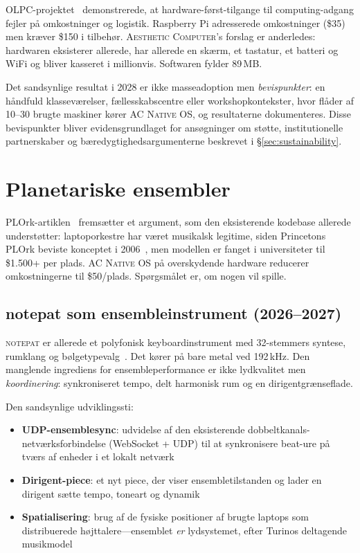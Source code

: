 \documentclass[10pt,letterpaper,twocolumn]{article}
\newcommand{\ac}{\textsc{Aesthetic Computer}}
\newcommand{\acos}{\textsc{AC Native OS}}
\newcommand{\np}{\textsc{notepat}}
\begin{document}
OLPC-projektet~\citep{kraemer2009olpc} demonstrerede, at hardware-først-tilgange til computing-adgang fejler på omkostninger og logistik. Raspberry Pi adresserede omkostninger (\$35) men kræver \$150 i tilbehør. \ac{}'s forslag er anderledes: hardwaren eksisterer allerede, har allerede en skærm, et tastatur, et batteri og WiFi og bliver kasseret i millionvis. Softwaren fylder 89\,MB.

Det sandsynlige resultat i 2028 er ikke masseadoption men \emph{bevispunkter}: en håndfuld klasseværelser, fællesskabscentre eller workshopkontekster, hvor flåder af 10--30 brugte maskiner kører \acos{}, og resultaterne dokumenteres. Disse bevispunkter bliver evidensgrundlaget for ansøgninger om støtte, institutionelle partnerskaber og bæredygtighedsargumenterne beskrevet i \S\ref{sec:sustainability}.


\section{Planetariske ensembler}
\label{sec:ensembles}

PLOrk-artiklen~\citep{scudder2026plork} fremsætter et argument, som den eksisterende kodebase allerede understøtter: laptoporkestre har været musikalsk legitime, siden Princetons PLOrk beviste konceptet i 2006~\citep{trueman2006plork}, men modellen er fanget i universiteter til \$1.500+ per plads. \acos{} på overskydende hardware reducerer omkostningerne til \$50/plads. Spørgsmålet er, om nogen vil spille.

\subsection{notepat som ensembleinstrument (2026--2027)}

\np{} er allerede et polyfonisk keyboardinstrument med 32-stemmers syntese, rumklang og bølgetypevalg~\citep{scudder2026notepat}. Det kører på bare metal ved 192\,kHz. Den manglende ingrediens for ensembleperformance er ikke lydkvalitet men \emph{koordinering}: synkroniseret tempo, delt harmonisk rum og en dirigentgrænseflade.

Den sandsynlige udviklingssti:

\begin{itemize}
  \item \textbf{UDP-ensemblesync}: udvidelse af den eksisterende dobbeltkanals-netværksforbindelse (WebSocket + UDP) til at synkronisere beat-ure på tværs af enheder i et lokalt netværk
  \item \textbf{Dirigent-piece}: et nyt piece, der viser ensembletilstanden og lader en dirigent sætte tempo, toneart og dynamik
  \item \textbf{Spatialisering}: brug af de fysiske positioner af brugte laptops som distribuerede højttalere---ensemblet \emph{er} lydsystemet, efter Turinos deltagende musikmodel~\citep{turino2008music}
\end{itemize}
\end{document}
